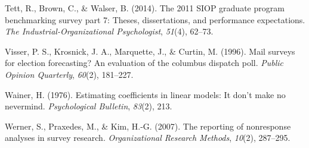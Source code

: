\documentclass[
  man,mask]{apa7}
\newlength{\cslhangindent}
\newenvironment{CSLReferences}[2] %
 {\begin{list}{}{%
  \setlength{\itemindent}{0pt}
  \setlength{\leftmargin}{0pt}
  \setlength{\parsep}{0pt}
  \ifodd #1
   \setlength{\leftmargin}{\cslhangindent}
   \setlength{\itemindent}{-1\cslhangindent}
  \fi
  \setlength{\itemsep}{#2\baselineskip}}}
 {\end{list}}
\begin{document}
\begin{CSLReferences}{1}{0}
Tett, R., Brown, C., \& Walser, B. (2014). The 2011 {SIOP} graduate program benchmarking survey part 7: Theses, dissertations, and performance expectations. \emph{The Industrial-Organizational Psychologist}, \emph{51}(4), 62--73.

Visser, P. S., Krosnick, J. A., Marquette, J., \& Curtin, M. (1996). Mail surveys for election forecasting? An evaluation of the columbus dispatch poll. \emph{Public Opinion Quarterly}, \emph{60}(2), 181--227.

Wainer, H. (1976). Estimating coefficients in linear models: It don't make no nevermind. \emph{Psychological Bulletin}, \emph{83}(2), 213.

Werner, S., Praxedes, M., \& Kim, H.-G. (2007). The reporting of nonresponse analyses in survey research. \emph{Organizational Research Methods}, \emph{10}(2), 287--295.

\end{CSLReferences}

\endgroup
\end{document}
